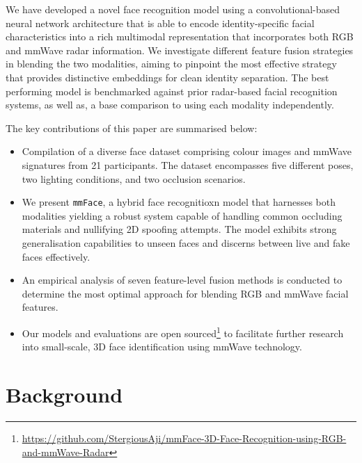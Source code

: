\documentclass{mpaper}
\begin{document}
We have developed a novel face recognition model using a convolutional-based neural network architecture that is able to encode identity-specific facial characteristics into a rich multimodal representation that incorporates both RGB and mmWave radar information. We investigate different feature fusion strategies in blending the two modalities, aiming to pinpoint the most effective strategy that provides distinctive embeddings for clean identity separation. The best performing model is benchmarked against prior radar-based facial recognition systems, as well as, a base comparison to using each modality independently.

The key contributions of this paper are summarised below:
\vspace{-0.48cm}
\begin{itemize}
    \itemsep 0.08cm
    \item Compilation of a diverse face dataset comprising colour images and mmWave signatures from 21 participants. The dataset encompasses five different poses, two lighting conditions, and two occlusion scenarios.
    \item We present \texttt{mmFace}, a hybrid face recognitioxn model that harnesses both modalities yielding a robust system capable of handling common occluding materials and nullifying 2D spoofing attempts. The model exhibits strong generalisation capabilities to unseen faces and discerns between live and fake faces effectively.
    \item An empirical analysis of seven feature-level fusion methods is conducted to determine the most optimal approach for blending RGB and mmWave facial features.
    \item Our models and evaluations are open sourced\footnote{\url{https://github.com/StergiousAji/mmFace-3D-Face-Recognition-using-RGB-and-mmWave-Radar}} to facilitate further research into small-scale, 3D face identification using mmWave technology.
\end{itemize}
\vspace{0.01cm}



\section{Background}
\end{document}

